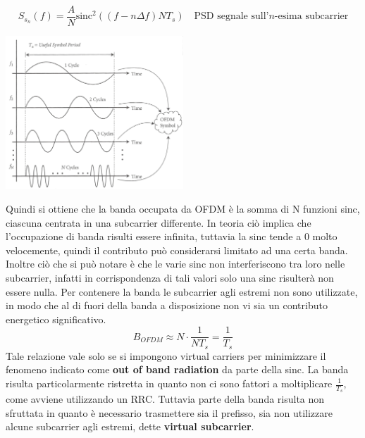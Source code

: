 
\[
    S_{s_n}(f) = \frac{A}{N} \text{sinc}^2 ((f-n\Delta f)N T_s) \quad \text{PSD segnale sull'$n$-esima subcarrier}
\]
\begin{center}
    \includegraphics[width=0.5\textwidth]{imgs/ofdm_sinc.png}
\end{center}


Quindi si ottiene che la banda occupata da OFDM è la somma di N funzioni sinc, ciascuna centrata in una subcarrier differente. In teoria ciò implica che l'occupazione di banda risulti essere infinita, tuttavia la sinc tende a 0 molto velocemente, quindi il contributo può considerarsi limitato ad una certa banda. Inoltre ciò che si può notare è che le varie sinc non interferiscono tra loro nelle subcarrier, infatti in corrispondenza di tali valori solo una sinc risulterà non essere nulla. Per contenere la banda le subcarrier agli estremi non sono utilizzate, in modo che al di fuori della banda a disposizione non vi sia un contributo energetico significativo.
\[
    B_{OFDM} \approx N \cdot \frac{1}{NT_s} = \frac{1}{T_s}
\]
Tale relazione vale solo se si impongono virtual carriers per minimizzare il fenomeno indicato come \textbf{out of band radiation} da parte della sinc.
La banda risulta particolarmente ristretta in quanto non ci sono fattori a moltiplicare $\frac{1}{T_s}$, come avviene utilizzando un RRC. Tuttavia parte della banda risulta non sfruttata in quanto è necessario trasmettere sia il prefisso, sia non utilizzare alcune subcarrier agli estremi, dette \textbf{virtual subcarrier}.



